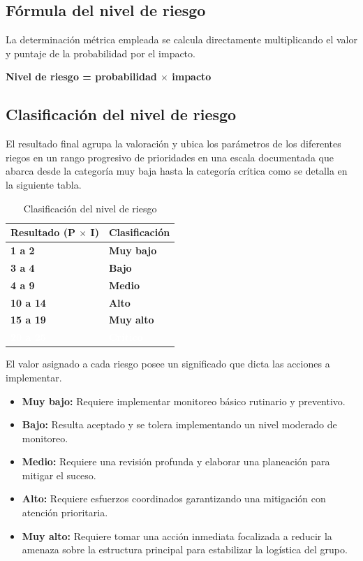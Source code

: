 \documentclass[11pt,spanish]{article}
\begin{document}
\subsection{Fórmula del nivel de riesgo}

La determinación métrica empleada se calcula directamente multiplicando el valor y puntaje de la probabilidad por el impacto.

\textbf{Nivel de riesgo = probabilidad $\times$ impacto}

\subsection{Clasificación del nivel de riesgo}

El resultado final agrupa la valoración y ubica los parámetros de los diferentes riegos en un rango progresivo de prioridades en una escala documentada que abarca desde la categoría muy baja hasta la categoría crítica como se detalla en la siguiente tabla.

\begin{table}[H]
\centering
\caption{Clasificación del nivel de riesgo}
\label{tab:clasificacion-riesgo}
\begin{tabularx}{0.6\textwidth}{X X}
\toprule
\textbf{Resultado (P $\times$ I)} & \textbf{Clasificación} \\
\midrule
\cellcolor{C_MuyBajo}\textbf{1 a 2} & \cellcolor{C_MuyBajo}\textbf{Muy bajo} \\
\cellcolor{C_Bajo}\textbf{3 a 4} & \cellcolor{C_Bajo}\textbf{Bajo} \\
\cellcolor{C_Medio}\textbf{4 a 9} & \cellcolor{C_Medio}\textbf{Medio} \\
\cellcolor{C_Alto}\textbf{10 a 14} & \cellcolor{C_Alto}\textbf{Alto} \\
\cellcolor{C_MuyAlto}\textbf{15 a 19} & \cellcolor{C_MuyAlto}\textbf{Muy alto} \\
\cellcolor{C_Critico}\textbf{\textcolor{white}{20 a 25}} & \cellcolor{C_Critico}\textbf{\textcolor{white}{Crítico}} \\
\bottomrule
\end{tabularx}
\end{table}

El valor asignado a cada riesgo posee un significado que dicta las acciones a implementar.

\begin{itemize}
    \item \textbf{Muy bajo:} Requiere implementar monitoreo básico rutinario y preventivo.
    \item \textbf{Bajo:} Resulta aceptado y se tolera implementando un nivel moderado de monitoreo.
    \item \textbf{Medio:} Requiere una revisión profunda y elaborar una planeación para mitigar el suceso.
    \item \textbf{Alto:} Requiere esfuerzos coordinados garantizando una mitigación con atención prioritaria.
    \item \textbf{Muy alto:} Requiere tomar una acción inmediata focalizada a reducir la amenaza sobre la estructura principal para estabilizar la logística del grupo.
\end{itemize}
\end{document}
